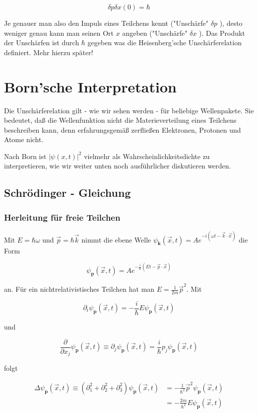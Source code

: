 \documentclass[10pt, letterpaper]{article}
\begin{document}
$$
\delta p \delta x(0)=\hbar
$$

Je genauer man also den Impuls eines Teilchens kennt ("Unschärfe" $\delta p$ ), desto weniger genau kann man seinen Ort $x$ angeben ("Unschärfe" $\delta x$ ). Das Produkt der Unschärfen ist durch $\hbar$ gegeben was die Heisenberg'sche Unschärferelation definiert. Mehr hierzu später!

\section*{Born'sche Interpretation}
Die Unschärferelation gilt - wie wir sehen werden - für beliebige Wellenpakete. Sie bedeutet, daß die Wellenfunktion nicht die Materieverteilung eines Teilchens beschreiben kann, denn erfahrungsgemäß zerfließen Elektronen, Protonen und Atome nicht.

Nach Born ist $|\psi(x, t)|^{2}$ vielmehr als Wahrscheinlichkeitsdichte zu interpretieren, wie wir weiter unten noch ausführlicher diskutieren werden.

\subsection*{Schrödinger - Gleichung}
\subsubsection*{Herleitung für freie Teilchen}
Mit $E=\hbar \omega$ und $\vec{p}=\hbar \vec{k}$ nimmt die ebene Welle $\psi_{\mathbf{k}}(\vec{x}, t)=A e^{-i(\omega t-\vec{k} \cdot \vec{x})}$ die Form

$$
\psi_{\mathbf{p}}(\vec{x}, t)=A e^{-\frac{i}{\hbar}(E t-\vec{p} \cdot \vec{x})}
$$

an. Für ein nichtrelativistisches Teilchen hat man $E=\frac{1}{2 m} \vec{p}^{2}$. Mit

$$
\partial_{t} \psi_{\mathbf{p}}(\vec{x}, t)=-\frac{i}{\hbar} E \psi_{\mathbf{p}}(\vec{x}, t)
$$

und

$$
\frac{\partial}{\partial x_{j}} \psi_{\mathbf{p}}(\vec{x}, t) \equiv \partial_{j} \psi_{\mathbf{p}}(\vec{x}, t)=\frac{i}{\hbar} p_{j} \psi_{\mathbf{p}}(\vec{x}, t)
$$

folgt

$$
\begin{aligned}
\Delta \psi_{\mathbf{p}}(\vec{x}, t) \equiv\left(\partial_{1}^{2}+\partial_{2}^{2}+\partial_{3}^{2}\right) \psi_{\mathbf{p}}(\vec{x}, t) & =-\frac{1}{\hbar^{2}} \vec{p}^{2} \psi_{\mathbf{p}}(\vec{x}, t) \\
& =-\frac{2 m}{\hbar^{2}} E \psi_{\mathbf{p}}(\vec{x}, t)
\end{aligned}
$$
\end{document}
